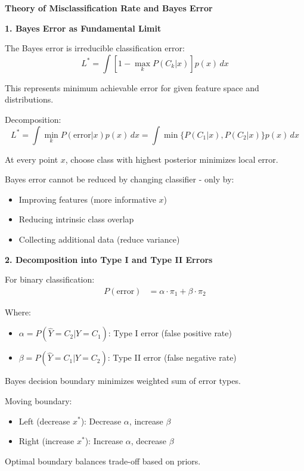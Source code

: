 \documentclass[12pt]{article}
\begin{document}
\begin{explanation}

\textbf{Theory of Misclassification Rate and Bayes Error}

\textbf{1. Bayes Error as Fundamental Limit}

The Bayes error is irreducible classification error:
\[L^* = \int [1 - \max_k P(C_k|x)] p(x) \, dx\]

This represents minimum achievable error for given feature space and distributions.

Decomposition:
\[L^* = \int \min_k P(\text{error}|x) p(x) \, dx = \int \min\{P(C_1|x), P(C_2|x)\} p(x) \, dx\]

At every point $x$, choose class with highest posterior minimizes local error.

Bayes error cannot be reduced by changing classifier - only by:
\begin{itemize}
\item Improving features (more informative $x$)
\item Reducing intrinsic class overlap
\item Collecting additional data (reduce variance)
\end{itemize}

\textbf{2. Decomposition into Type I and Type II Errors}

For binary classification:
\begin{align*}
P(\text{error}) &= \alpha \cdot \pi_1 + \beta \cdot \pi_2
\end{align*}

Where:
\begin{itemize}
\item $\alpha = P(\hat{Y} = C_2 | Y = C_1)$: Type I error (false positive rate)
\item $\beta = P(\hat{Y} = C_1 | Y = C_2)$: Type II error (false negative rate)
\end{itemize}

Bayes decision boundary minimizes weighted sum of error types.

Moving boundary:
\begin{itemize}
\item Left (decrease $x^*$): Decrease $\alpha$, increase $\beta$
\item Right (increase $x^*$): Increase $\alpha$, decrease $\beta$
\end{itemize}

Optimal boundary balances trade-off based on priors.


\end{explanation}
\end{document}
